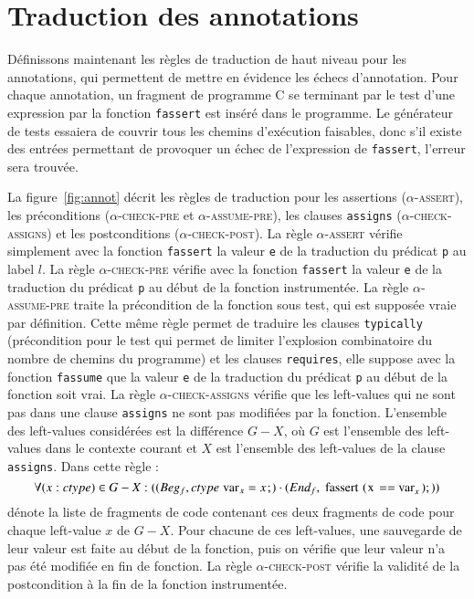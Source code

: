 \section{Traduction des annotations \eacsl}
\label{sec:annot}


Définissons maintenant les règles de traduction de haut niveau pour les
annotations, qui permettent de mettre en évidence les échecs d'annotation.
Pour chaque annotation, un fragment de programme C se terminant par le test
d'une expression par la fonction \lstinline'fassert' est inséré dans le
programme.
Le générateur de tests essaiera de couvrir tous les chemins d'exécution
faisables, donc s'il existe des entrées permettant de provoquer un échec de
l'expression de \lstinline'fassert', l'erreur sera trouvée.



La figure~\ref{fig:annot} décrit les règles de traduction pour les assertions
(\textsc{$\alpha$-assert}), les préconditions (\textsc{$\alpha$-check-pre} et
\textsc{$\alpha$-assume-pre}), les clauses \lstinline'assigns'
(\textsc{$\alpha$-check-assigns}) et les postconditions
(\textsc{$\alpha$-check-post}).
La règle \textsc{$\alpha$-assert} vérifie simplement avec la fonction
\lstinline'fassert' la valeur \lstinline'e' de la traduction du prédicat
\lstinline'p' au label $l$.
La règle \textsc{$\alpha$-check-pre} vérifie avec la fonction
\lstinline'fassert' la valeur \lstinline'e' de la traduction du prédicat
\lstinline'p' au début de la fonction instrumentée.
La règle \textsc{$\alpha$-assume-pre} traite la précondition de la fonction sous
test, qui est supposée vraie par définition.
Cette même règle permet de traduire les clauses \lstinline'typically'
(précondition pour le test qui permet de limiter l'explosion combinatoire du
nombre de chemins du programme) et les clauses \lstinline'requires', elle
suppose avec la fonction \lstinline'fassume' que la valeur \lstinline'e' de la
traduction du prédicat \lstinline'p' au début de la fonction soit vrai.
La règle \textsc{$\alpha$-check-assigns} vérifie que les left-values qui ne sont
pas dans une clause \lstinline'assigns' ne sont pas modifiées par la fonction.
L'ensemble des left-values considérées est la différence $G-X$, où $G$ est
l'ensemble des left-values dans le contexte courant et $X$ est l'ensemble des
left-values de la clause \lstinline'assigns'.
Dans cette règle :
\[
\forall (x:ctype) \in G-X :
((Beg_f, ctype~\mbox{\lstinline'var'}_x = x\semicolon)
\concat (End_f, \mbox{\lstinline'fassert(x == var'}_x\mbox{\lstinline');'}) )
\]
dénote la liste de fragments de code contenant ces deux fragments de code pour
chaque left-value $x$ de $G-X$.
Pour chacune de ces left-values, une sauvegarde de leur valeur est faite au
début de la fonction, puis on vérifie que leur valeur n'a pas été modifiée en
fin de fonction.
La règle \textsc{$\alpha$-check-post} vérifie la validité de la postcondition
à la fin de la fonction instrumentée.

